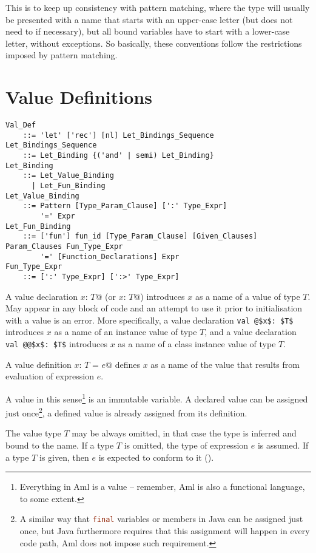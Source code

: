 This is to keep up consistency with pattern matching, where the type will usually be presented with a name that starts with an upper-case letter (but does not need to if necessary), but all bound variables have to start with a lower-case letter, without exceptions. So basically, these conventions follow the restrictions imposed by pattern matching. 





\section{Value Definitions}
\label{sec:value-def}

\grammar\begin{lstlisting}
Val_Def 
    ::= 'let' ['rec'] [nl] Let_Bindings_Sequence
Let_Bindings_Sequence
    ::= Let_Binding {('and' | semi) Let_Binding}
Let_Binding
    ::= Let_Value_Binding
      | Let_Fun_Binding
Let_Value_Binding
    ::= Pattern [Type_Param_Clause] [':' Type_Expr]
        '=' Expr
Let_Fun_Binding
    ::= ['fun'] fun_id [Type_Param_Clause] [Given_Clauses] Param_Clauses Fun_Type_Expr
        '=' [Function_Declarations] Expr
Fun_Type_Expr
    ::= [':' Type_Expr] [':>' Type_Expr]
\end{lstlisting}

A value declaration \lstinline@let $x$: $T$@ (or \lstinline@let $x$: $T$@) introduces $x$ as a name of a value of type $T$. May appear in any block of code and an attempt to use it prior to initialisation with a value is an error. More specifically, a value declaration \lstinline+val @$x$: $T$+ introduces $x$ as a name of an instance value of type $T$, and a value declaration \lstinline+val @@$x$: $T$+ introduces $x$ as a name of a class instance value of type $T$. 

A value definition \lstinline@val $x$: $T$ = $e$@ defines $x$ as a name of the value that results from evaluation of expression $e$.

A value in this sense\footnote{Everything in Aml is a value -- remember, Aml is also a functional language, to some extent.} is an immutable variable. A declared value can be assigned just once\footnote{A similar way that \lstinline[language=Java]@final@ variables or members in Java can be assigned just once, but Java furthermore requires that this assignment will happen in every code path, Aml does not impose such requirement.}, a defined value is already assigned from its definition. 

The value type $T$ may be always omitted, in that case the type is inferred and bound to the name. If a type $T$ is omitted, the type of expression $e$ is assumed. If a type $T$ is given, then $e$ is expected to conform to it (). 

